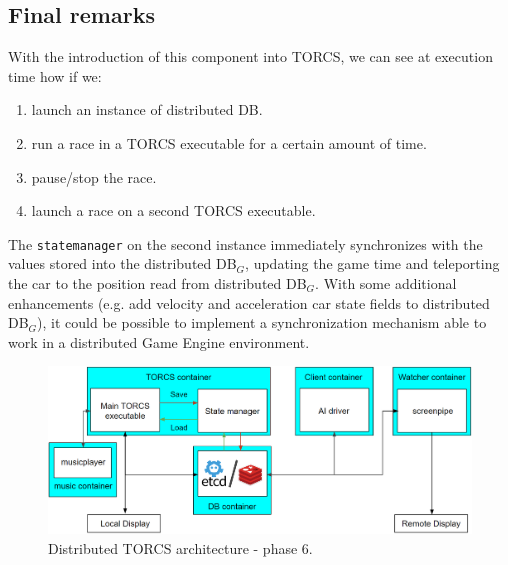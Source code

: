 \subsection{Final remarks}
With the introduction of this component into TORCS, we can see at execution time how if we:
\begin{enumerate}
	\item launch an instance of distributed DB.
	\item run a race in a TORCS executable for a certain amount of time.
	\item pause/stop the race.
	\item launch a race on a second TORCS executable.
\end{enumerate}
The \texttt{statemanager} on the second instance immediately synchronizes with the values stored into the distributed DB$_G$, updating the game time and teleporting the car to the position read from distributed DB$_G$.
With some additional enhancements (e.g. add velocity and acceleration car state fields to distributed DB$_G$), it could be possible to implement a synchronization mechanism able to work in a distributed Game Engine environment.

\begin{figure}
	\centering
	\includegraphics[width=0.95\linewidth]{"immagini/Software development/Development-6"}
	\caption[Distributed TORCS architecture - phase 6.]{Distributed TORCS architecture - phase 6.}
	\label{fig:development-6}
\end{figure}


